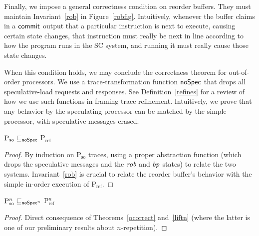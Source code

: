 Finally, we impose a general correctness condition on reorder
buffers.  They must maintain Invariant~\ref{rob} in Figure~\ref{robfig}.
Intuitively, whenever the buffer claims in a $\mathsf{commit}$
output that a particular instruction is next to execute, causing
certain state changes, that instruction must really be next in line according
to how the program runs in the SC system, and running it must really cause
those state changes.

When this condition holds, we may conclude the correctness theorem for
out-of-order processors.  We use a trace-transformation function
$\mathsf{noSpec}$ that drops all speculative-load requests and responses.
See Definition~\ref{refines} for a review of how we use such
functions in framing trace refinement.  Intuitively, we prove that any
behavior by the speculating processor can be matched by the simple
processor, with speculative messages erased.

\begin{theorem}
\label{ocorrect}
$\text{P$_\text{so}$} \sqsubseteq_{\mathsf{noSpec}}$ P$_\text{ref}$
\end{theorem}
\begin{proof}
By induction on P$_\text{so}$ traces, using a proper abstraction
function (which drops the speculative messages and the $\mathit{rob}$ and $\mathit{bp}$ states) to relate the two systems.  Invariant~\ref{rob} is crucial to
relate the reorder buffer's behavior with the simple in-order
execution of P$_\text{ref}$.
\end{proof}

\begin{corollary}
\label{ges}
$\text{P$^n_\text{so}$} \sqsubseteq_{\mathsf{noSpec}^n}$ P$_\text{ref}^n$
\end{corollary}
\begin{proof}
Direct consequence of Theorems~\ref{ocorrect} and~\ref{liftn} (where the
latter is one of our preliminary results about $n$-repetition).
\end{proof}
